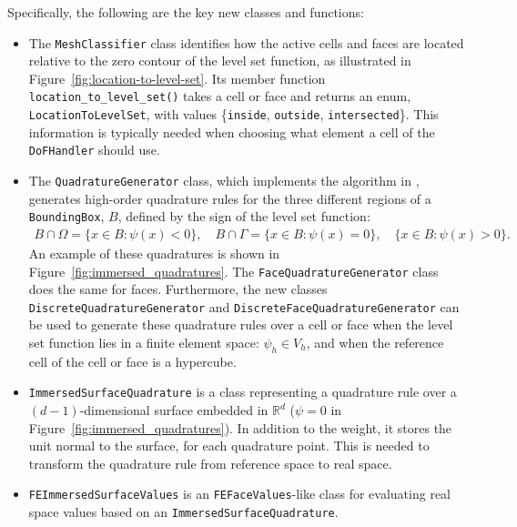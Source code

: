 \documentclass{ansarticle-preprint}
\begin{document}
Specifically, the following are the key new classes and functions:
\begin{itemize}
  \item The \texttt{MeshClassifier} class identifies how the active cells and faces are located relative to the zero contour of the level set function, as illustrated in Figure~\ref{fig:location-to-level-set}. Its member function \texttt{location\_to\_level\_set()} takes a cell or face and
        returns an enum, \texttt{LocationToLevelSet}, with values \{\texttt{inside}, \texttt{outside}, \texttt{intersected}\}.
        This information is typically needed when choosing what element a cell of the \texttt{DoFHandler} should use.

  \item The \texttt{QuadratureGenerator} class, which implements the algorithm in \cite{saye2015}, generates high-order quadrature rules for the three different regions of a \texttt{BoundingBox}, $B$, defined by the sign of the level set function:
        \begin{align}\label{eq:boundingbox}
          B \cap \Omega = \{ x\in B:  \psi(x) < 0 \},  \quad
          B \cap \Gamma = \{ x\in B:  \psi(x) = 0 \},  \quad
          \{ x\in B:  \psi(x) > 0 \}.
        \end{align}
        An example of these quadratures is shown in Figure~\ref{fig:immersed_quadratures}.
        The \texttt{FaceQuadratureGenerator} class does the same for faces.
        Furthermore, the new classes \texttt{DiscreteQuadratureGenerator} and \texttt{DiscreteFaceQuadratureGenerator} can be used to generate these quadrature rules over a cell or face when the level set function lies in a finite element space: $\psi_h \in V_h$, and when the reference cell of the cell or face is a hypercube.

  \item \texttt{ImmersedSurfaceQuadrature} is a class representing a quadrature rule over a $(d-1)$-dimensional surface embedded in $\mathbb{R}^d$ ($\psi = 0$ in Figure~\ref{fig:immersed_quadratures}). In addition to the weight, it stores the unit normal to the surface, for each quadrature point. This is needed to transform the quadrature rule from reference space to real space.

  \item \texttt{FEImmersedSurfaceValues} is an \texttt{FEFaceValues}-like class for evaluating real space values based on an \texttt{ImmersedSurfaceQuadrature}.


\end{itemize}
\end{document}
